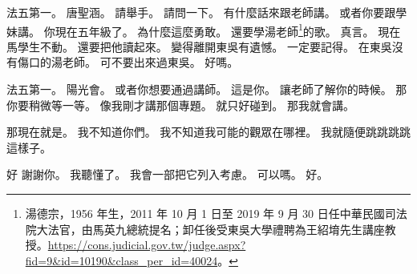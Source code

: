 \hypertarget{c01:cue:1966}{}法五第一。
\hypertarget{c01:cue:1967}{}唐聖涵。
\hypertarget{c01:cue:1968}{}請舉手。
\hypertarget{c01:cue:1969}{}請問一下。
\hypertarget{c01:cue:1970}{}有什麼話來跟老師講。
\hypertarget{c01:cue:1971}{}或者你要跟學妹講。
\hypertarget{c01:cue:1972}{}你現在五年級了。
\hypertarget{c01:cue:1973}{}為什麼這麼勇敢。
\hypertarget{c01:cue:1974}{}還要學湯老師\footnote{湯德宗，1956 年生，2011 年 10 月 1 日至 2019 年 9 月 30 日任中華民國司法院大法官，由馬英九總統提名；卸任後受東吳大學禮聘為王紹堉先生講座教授。\url{https://cons.judicial.gov.tw/judge.aspx?fid=9&id=10190&class_per_id=40024}。}的歌。
\hypertarget{c01:cue:1975}{}真言。
\hypertarget{c01:cue:1976}{}現在馬學生不動。
\hypertarget{c01:cue:1977}{}還要把他讀起來。
\hypertarget{c01:cue:1978}{}變得離開東吳有遺憾。
\hypertarget{c01:cue:1979}{}一定要記得。
\hypertarget{c01:cue:1980}{}在東吳沒有傷口的湯老師。
\hypertarget{c01:cue:1981}{}可不要出來過東吳。
\hypertarget{c01:cue:1982}{}好嗎。

\hypertarget{c01:cue:1983}{}法五第一。
\hypertarget{c01:cue:1984}{}陽光會。
\hypertarget{c01:cue:1985}{}或者你想要通過講師。
\hypertarget{c01:cue:1986}{}這是你。
\hypertarget{c01:cue:1987}{}讓老師了解你的時候。
\hypertarget{c01:cue:1988}{}那你要稍微等一等。
\hypertarget{c01:cue:1989}{}像我剛才講那個專題。
\hypertarget{c01:cue:1990}{}就只好碰到。
\hypertarget{c01:cue:1991}{}那我就會講。

\hypertarget{c01:cue:1992}{}那現在就是。
\hypertarget{c01:cue:1993}{}我不知道你們。
\hypertarget{c01:cue:1994}{}我不知道我可能的觀眾在哪裡。
\hypertarget{c01:cue:1995}{}我就隨便跳跳跳跳這樣子。

\hypertarget{c01:cue:1996}{}好 謝謝你。
\hypertarget{c01:cue:1997}{}我聽懂了。
\hypertarget{c01:cue:1998}{}我會一部把它列入考慮。
\hypertarget{c01:cue:1999}{}可以嗎。
\hypertarget{c01:cue:2000}{}好。

